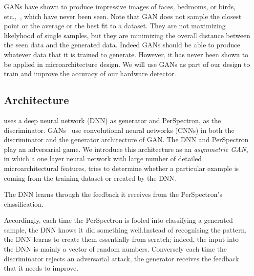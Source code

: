 GANs have shown to produce impressive images of faces, bedrooms, or birds, etc.,~\cite{}, which have never been seen. Note that GAN does not sample the closest point or the average or the best fit to a dataset. They are not maximizing likelyhood of single samples, but they are minimizing the overall distance between the seen data and the generated data.  Indeed GANs should be able to produce whatever data that it is trained to generate. However, it has never been shown to be applied in microarchitecture design. We will use GANs as part of our design to train and improve the accuracy of our hardware detector.  



\subsection{{\scheme} Architecture}

{\scheme} uses a deep neural network (DNN) as generator and PerSpectron,  as the discriminator.  GANs~\cite{goodfellow2014generative} use convolutional neural
networks (CNNs) in both the discriminator and the generator
architecture of GAN.  The DNN and PerSpectron play an
adversarial game. We introduce this architecture as an {\em asymmetric GAN}, in which a one layer neural network with large number of detailed microarchitectural features, tries to determine whether a particular example is coming from the training dataset or created by the DNN. 

The DNN learns through the feedback it receives from the PerSpectron's classification. 

 Accordingly, each time the PerSpectron is fooled into classifying a generated sample, the DNN knows it did something well.Instead of recognising the pattern, the DNN learns to create them essentially from scratch; indeed, the input into the DNN is mainly a vector of random numbers.  Conversely each time the discriminator  rejects an adversarial attack, the generator receives the feedback that it needs to improve.
 
